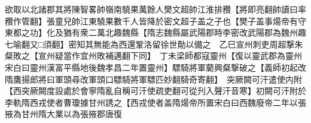 欲取以北諸郡其將陳智畧帥嶺南驍果萬餘人樊文超帥江淮排䂎【將即亮翻帥讀曰率䂎作管翻】張童兒帥江東驍果數千人皆降於密文超子盖之子也【樊子盖事煬帝有守東都之功】化及猶有衆二萬北趣魏縣【隋志魏縣屬武陽郡時李密改武陽郡為魏州趣七喻翻又□須翻】密知其無能為西還鞏洛留徐世勣以備之　乙巳宣州刺吏周超撃朱粲敗之【宣州疑當作宜州敗補邁翻下同】　丁未梁師都寇靈州【復以靈武郡為靈州宋白曰靈州漢富平縣地後魏孝昌二年置靈州】驃騎將軍藺興粲撃破之【義師初起改隋鷹揚郎將曰軍頭尋改軍頭口驃騎將軍驃匹妙翻騎奇寄翻】　突厥闕可汗遣使内附【西突厥闕度設處於會寧隋亂自稱可汗使疏吏翻可從刋入聲汗音寒】初闕可汗附於李軌隋西戎使者曹瓊據甘州誘之【西戎使者盖隋煬帝所置宋白曰西魏廢帝二年以張掖為甘州隋大業以為張掖郡唐復